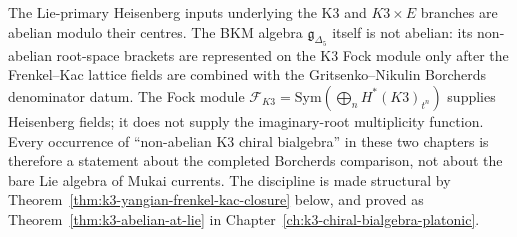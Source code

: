 \begin{remark}
\label{rem:k3-yangian-abelian-at-lie}
The Lie-primary Heisenberg inputs underlying the K3 and \(K3\times E\)
branches are abelian modulo their centres. The BKM algebra
\(\mathfrak{g}_{\Delta_5}\) itself is not abelian: its non-abelian
root-space brackets are represented on the K3 Fock module only after the
Frenkel--Kac lattice fields are combined with the Gritsenko--Nikulin
Borcherds denominator datum. The Fock module
$\mathcal{F}_{K3}=\mathrm{Sym}(\bigoplus_n H^*(K3)_{t^n})$ supplies
Heisenberg fields; it does not supply the imaginary-root multiplicity
function. Every occurrence of ``non-abelian K3 chiral bialgebra'' in
these two chapters is therefore a statement about the completed
Borcherds comparison, not about the bare Lie algebra of Mukai currents.
The discipline is made structural by
Theorem~\ref{thm:k3-yangian-frenkel-kac-closure} below, and proved as
Theorem~\ref{thm:k3-abelian-at-lie} in Chapter~\ref{ch:k3-chiral-bialgebra-platonic}.
\end{remark}

